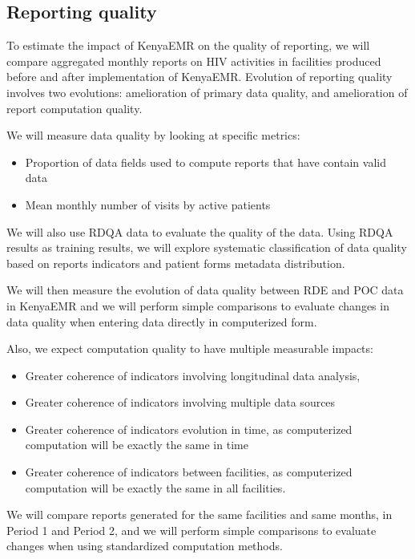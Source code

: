 \documentclass[a4paper,11pt,draft,twoside]{article}
\begin{document}
\subsection{Reporting quality}
\label{sec:rep_quality}
To estimate the impact of KenyaEMR on the quality of reporting, we will compare aggregated monthly reports on HIV activities in facilities produced before and after implementation of KenyaEMR. Evolution of reporting quality involves two evolutions: amelioration of primary data quality, and amelioration of report computation quality.



We will measure data quality by looking at specific metrics:
\begin{itemize}
\item	Proportion of data fields used to compute reports that have contain valid data
\item	Mean monthly number of visits by active patients
\end{itemize}

We will also use RDQA data to evaluate the quality of the data. Using RDQA results as training results, we will explore systematic classification of data quality based on reports indicators and patient forms metadata distribution.

We will then measure the evolution of data quality between RDE and POC data in KenyaEMR and we will perform simple comparisons to evaluate changes in data quality when entering data directly in computerized form.

Also, we expect computation quality to have multiple measurable impacts:
\begin{itemize}
\item	Greater coherence of indicators involving longitudinal data analysis,
\item	Greater coherence of indicators involving multiple data sources
\item	Greater coherence of indicators evolution in time, as computerized computation will be exactly the same in time
\item	Greater coherence of indicators between facilities, as computerized computation will be exactly the same in all facilities.
\end{itemize}

We will compare reports generated for the same facilities and same months, in Period 1 and Period 2, and we will perform simple comparisons to evaluate changes when using standardized computation methods.
\end{document}
